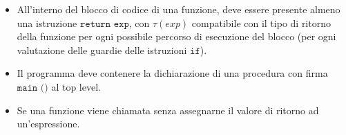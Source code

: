 \begin{itemize}
	\item All'interno del blocco di codice di una funzione, deve essere presente almeno una istruzione $\texttt{return exp}$, con $\tau(exp)$ compatibile con il tipo di ritorno della funzione per ogni possibile percorso di esecuzione del blocco (per ogni valutazione delle guardie delle istruzioni $\texttt{if}$).
	\item Il programma deve contenere la dichiarazione di una procedura con firma $\texttt{main ()}$ al top level.
	\item Se una funzione viene chiamata senza assegnarne il valore di ritorno ad un'espressione.
\end{itemize}